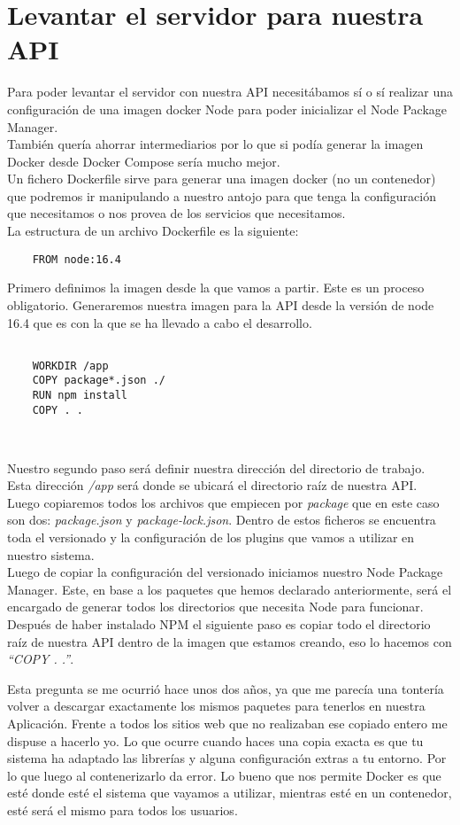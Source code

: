 \section{Levantar el servidor para nuestra API}
Para poder levantar el servidor con nuestra API necesitábamos sí o sí realizar una configuración de una imagen docker Node para poder inicializar el Node Package Manager.
\\También quería ahorrar intermediarios por lo que si podía generar la imagen Docker desde Docker Compose sería mucho mejor.
\\Un fichero Dockerfile sirve para generar una imagen docker (no un contenedor) que podremos ir manipulando a nuestro antojo para que tenga la configuración que necesitamos o nos provea de los servicios que necesitamos.
\\La estructura de un archivo Dockerfile es la siguiente:
\begin{verbatim}
    FROM node:16.4
\end{verbatim}
Primero definimos la imagen desde la que vamos a partir. Este es un proceso obligatorio. Generaremos nuestra imagen para la API desde la versión de node 16.4 que es con la que se ha llevado a cabo el desarrollo.
\begin{verbatim}

    WORKDIR /app
    COPY package*.json ./
    RUN npm install
    COPY . .

    
\end{verbatim}
Nuestro segundo paso será definir nuestra dirección del directorio de trabajo. Esta dirección \textit{/app} será donde se ubicará el directorio raíz de nuestra API.
\\Luego copiaremos todos los archivos que empiecen por \textit{package} que en este caso son dos: \textit{package.json} y \textit{package-lock.json}. Dentro de estos ficheros se encuentra toda el versionado y la configuración de los plugins que vamos a utilizar en nuestro sistema.
\\Luego de copiar la configuración del versionado iniciamos nuestro Node Package Manager. Este, en base a los paquetes que hemos declarado anteriormente, será el encargado de generar todos los directorios que necesita Node para funcionar.
\\Después de haber instalado NPM el siguiente paso es copiar todo el directorio raíz de nuestra API dentro de la imagen que estamos creando, eso lo hacemos con \textit{``COPY . .''}.
\begin{tcolorbox}
    [colback=green!5!white,colframe=green!75!black,fonttitle=\bfseries,title=¿Por qué no copiamos directamente nuestro directorio raíz con los plugins y demás?]
    Esta pregunta se me ocurrió hace unos dos años, ya que me parecía una tontería volver a descargar exactamente los mismos paquetes para tenerlos en nuestra Aplicación. Frente a todos los sitios web que no realizaban ese copiado entero me dispuse a hacerlo yo. Lo que ocurre cuando haces una copia exacta es que tu sistema ha adaptado las librerías y alguna configuración extras a tu entorno. Por lo que luego al contenerizarlo da error. Lo bueno que nos permite Docker es que esté donde esté el sistema que vayamos a utilizar, mientras esté en un contenedor, esté será el mismo para todos los usuarios.
\end{tcolorbox}
